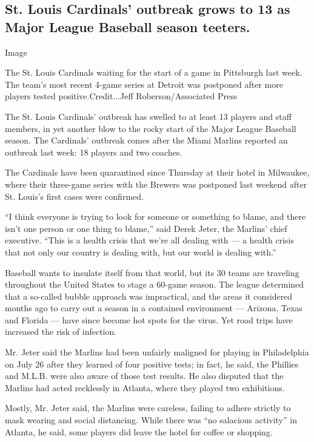 \hypertarget{st-louis-cardinals-outbreak-grows-to-13-as-major-league-baseball-season-teeters}{%
\subsection{St. Louis Cardinals' outbreak grows to 13 as Major League
Baseball season
teeters.}\label{st-louis-cardinals-outbreak-grows-to-13-as-major-league-baseball-season-teeters}}

Image

The St. Louis Cardinals waiting for the start of a game in Pittsburgh
last week. The team's most recent 4-game series at Detroit was postponed
after more players tested positive.Credit...Jeff Roberson/Associated
Press

The St. Louis Cardinals' outbreak has swelled to at least 13 players and
staff members, in yet another blow to the rocky start of the Major
League Baseball season. The Cardinals' outbreak comes after the Miami
Marlins reported an outbreak last week: 18 players and two coaches.

The Cardinals have been quarantined since Thursday at their hotel in
Milwaukee, where their three-game series with the Brewers was postponed
last weekend after St. Louis's first cases were confirmed.

``I think everyone is trying to look for someone or something to blame,
and there isn't one person or one thing to blame,'' said Derek Jeter,
the Marlins' chief executive. ``This is a health crisis that we're all
dealing with --- a health crisis that not only our country is dealing
with, but our world is dealing with.''

Baseball wants to insulate itself from that world, but its 30 teams are
traveling throughout the United States to stage a 60-game season. The
league determined that a so-called bubble approach was impractical, and
the areas it considered months ago to carry out a season in a contained
environment --- Arizona, Texas and Florida --- have since become hot
spots for the virus. Yet road trips have increased the risk of
infection.

Mr. Jeter said the Marlins had been unfairly maligned for playing in
Philadelphia on July 26 after they learned of four positive tests; in
fact, he said, the Phillies and M.L.B. were also aware of those test
results. He also disputed that the Marlins had acted recklessly in
Atlanta, where they played two exhibitions.

Mostly, Mr. Jeter said, the Marlins were careless, failing to adhere
strictly to mask wearing and social distancing. While there was ``no
salacious activity'' in Atlanta, he said, some players did leave the
hotel for coffee or shopping.

